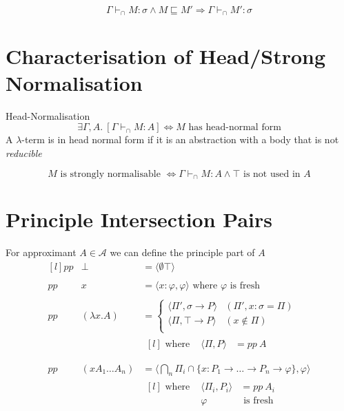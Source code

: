 \[\Gamma \vdash_\cap M : \sigma \land M \sqsubseteq M' \Rightarrow \Gamma \vdash_\cap M' : \sigma\]

\section{Characterisation of Head/Strong Normalisation}
\begin{definitionbox}{Head-Normalisation}
    \[\exists \Gamma, A . \ [\Gamma \vdash_\cap M : A] \Leftrightarrow M \text{ has head-normal form}\]
    A $\lambda$-term is in head normal form if it is an abstraction with a body that is not \textit{reducible}
\end{definitionbox}
\[M \text{ is strongly normalisable } \Leftrightarrow \Gamma \vdash_\cap M : A \land \top \text{ is not used in } A\]

\section{Principle Intersection Pairs}
For approximant $A \in \mathcal{A}$ we can define the principle part of $A$
\[\begin{matrix*}[l]
    pp & \bot & = \langle \emptyset \top \rangle \\
    \\
    pp & x & = \langle x : \varphi , \varphi \rangle \text{ where $\varphi$ is fresh}\\
    \\
    pp & (\lambda x . A) & = \begin{cases}
        \langle \Pi', \sigma \to P \rangle & (\Pi',x:\sigma = \Pi) \\
        \langle \Pi, \top \to P \rangle & (x \not\in \Pi) \\
    \end{cases} \\
    & & \begin{matrix*}[l]
        \text{ where } & \langle \Pi, P \rangle & = pp \ A \\
    \end{matrix*} \\
    \\
    pp & (x A_1 \dots A_n) & = \langle \bigcap_n\Pi_i \cap \{x: P_1 \to \dots \to P_n \to \varphi\}, \varphi \rangle \\
    & & \begin{matrix*}[l]
        \text{ where } & \langle \Pi_i, P_i \rangle & = pp \ A_i \\
        & \varphi & \text{ is fresh} \\
    \end{matrix*} \\
\end{matrix*}\]
